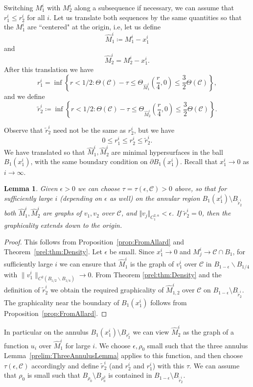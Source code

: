\documentclass[12pt, reqno ]{amsart}
\newtheorem{lemma}[theorem]{Lemma}
\numberwithin{equation}{section}
\begin{document}
Switching $M^i_1$ with $M^i_2$ along a subsequence if necessary, we can assume that $r_1^i\leq r_2^i$ for all $i$. Let us translate both sequences by the same quantities so that the $M_1^i$ are ``centered" at the origin, i.e, let us define 
$$ \hat M_1^i\coloneqq M_1^i-x^i_1$$ 
and 
$$\hat M_2^i=M_2^i-x^i_1.$$ 
After this translation we have 
$$r_1^i=\inf\left\{r < 1/2: \Theta(\mathcal C)-\tau\leq \Theta_{\hat M_1^i}\left(\frac{r}{4}, 0\right)\leq \frac{3}{2}\Theta(\mathcal C)\right\}, $$
and we define 
$$ \tilde r_2^i\coloneqq \inf\left\{r < 1 /2:\Theta(\mathcal C)-\tau \leq\Theta_{\hat M_2^i} \left(\frac{r}{4}, 0\right)\leq \frac{3}{2}\Theta(\mathcal C) \right\}.$$

Observe that $\tilde r_2^i$ need not be the same as $r_2^i$, but we have
$$ 0\leq r_1^i\leq r_2^i \leq \tilde r_2^i.$$
We have translated so that $\hat M_1^i, \hat M_2^i$ are minimal hypersurfaces in the ball $B_1(x^i_1)$, with the same boundary condition on $\partial B_1(x^i_1)$. Recall  that $x^i_1 \to 0$ as $i\to\infty$. 

\begin{lemma}\label{lem:graph}
Given $\epsilon > 0$ we can choose $\tau = \tau(\epsilon, \mathcal{C}) > 0$ above, so that for sufficiently large $i$ (depending on $\epsilon$ as well) on the annular region $B_1(x_1^i)\setminus B_{\tilde{r}^i_2}$ both $\hat{M}^i_1, \hat{M}^i_2$ are graphs of $v_1, v_2$ over $\mathcal{C}$, and $\Vert v_j\Vert_{C^{2,\alpha}_{1}} < \epsilon$. If $\tilde{r}_2^i=0$, then the graphicality extends down to the origin.
\end{lemma}
\begin{proof}
 This follows from Proposition~\ref{prop:FromAllard} and Theorem~\ref{prel:thm:Density}. Let $\epsilon$ be small. Since $x_1^i\to 0$ and $M^i_j \to \mathcal{C}\cap B_1$, for sufficiently large $i$ we can ensure that $\hat M_1^i$ is the graph of $v_1^i$ over $\mathcal C$ in $B_{1-\epsilon}\backslash B_{1/4}$ with $\|v_1^i\|_{C^2(B_{1/2}\backslash B_{1/4})}\to 0$. From  Theorem \ref{prel:thm:Density} and the definition of $\tilde{r}_2^i$ we obtain the required graphicality of $\hat{M}^i_{1,2}$ over $\mathcal{C}$ on $B_{1-\epsilon} \setminus B_{\tilde{r}_2^i}$. The graphicality near the boundary of $B_1(x^i_1)$ follows from Proposition~\ref{prop:FromAllard}.
\end{proof}

In particular on the annulus $B_1(x^i_1) \setminus B_{r^i_2}$ we can view $\hat{M}^i_2$ as the graph of a function $u_i$ over $\hat{M}^i_1$ for large $i$. 
We choose $\epsilon, \rho_0$ small such that the three annulus Lemma~\ref{prelim:ThreeAnnulusLemma} applies to this function, and then choose $\tau(\epsilon, \mathcal C)$ accordingly and define $\tilde r_2^i$ (and $r_2^i$ and $r_1^i$) with this $\tau$. We can assume that $\rho_0$ is small such that  $B_{\rho_0} \setminus B_{\rho_0^2}$ is contained in $B_{1-\epsilon}\setminus B_{\tilde{r}^i_2}$. 
\end{document}

